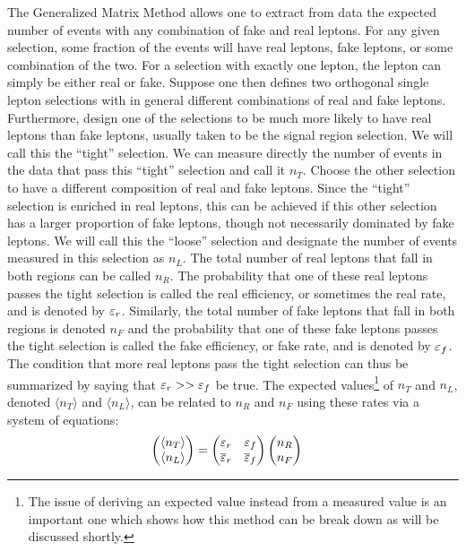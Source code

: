 The Generalized Matrix Method allows one to extract from data the expected
number of events with any combination of fake and real leptons.
For any given selection, some fraction of the events will have 
real leptons, fake leptons, or some combination of the two.
For a selection with exactly one lepton, the lepton 
can simply be either real or fake.  Suppose one then defines
two orthogonal single lepton
selections with in general different combinations of real and fake leptons.
Furthermore, design one of the selections to be much more likely to have
real leptons than fake leptons, usually taken 
to be the signal region selection. We will call this the ``tight'' selection.
We can measure directly the number of events in the data that
pass this ``tight'' selection and call it $n_T$. Choose the other selection
to have a different composition of real and fake leptons. Since the 
``tight'' selection is enriched in real leptons, this can be achieved
if this other selection has a larger proportion of fake leptons, though
not necessarily dominated by fake leptons. We will call this the
``loose'' selection and designate the number of events measured
in this selection as $n_L$. The total number of real leptons that fall in 
both regions can be called $n_R$. The probability that one of these
real leptons passes the tight selection is called the 
real efficiency, or sometimes the real rate, and is denoted by 
$\varepsilon_r$. Similarly, the total number of fake leptons 
that fall in both regions is denoted $n_F$ and the probability 
that one of these fake leptons passes the tight selection is 
called the fake efficiency, or fake rate, and is 
denoted by $\varepsilon_f$. The condition that
more real leptons pass the tight selection can thus be summarized by saying
that $\varepsilon_r>>\varepsilon_f$ be true.
The expected values\footnote{The issue
of deriving an expected value instead from a measured value
is an important one which shows how this method can be break down 
as will be discussed shortly.} of  $n_T$ and $n_L$,
denoted $\langle n_T\rangle$ and $\langle n_L\rangle$,
can be related to $n_R$ and $n_F$ using these rates via a system of
equations:
\begin{align}
  \label{eq:mxm_single}
  \begin{pmatrix} \langle n_T\rangle \\ \langle n_L\rangle \end{pmatrix} 
  &= 
  \begin{pmatrix}
  \varepsilon_r & \varepsilon_f \\ \overline{\varepsilon}_r & \overline{\varepsilon}_f
  \end{pmatrix} 
  \begin{pmatrix} n_R \\ n_F \end{pmatrix}
\end{align}
